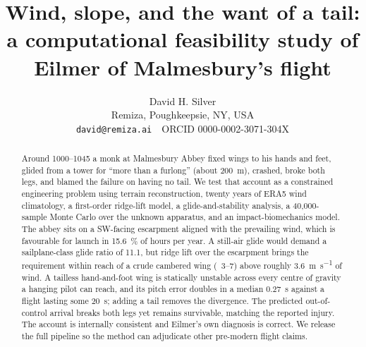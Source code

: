 \documentclass[11pt]{article}
\title{\bfseries Wind, slope, and the want of a tail:\\
a computational feasibility study of Eilmer of Malmesbury's flight}
\author{}
\author{David H. Silver \\[3pt]
    {\normalsize Remiza, Poughkeepsie, NY, USA} \\[1pt]
    {\small \texttt{david@remiza.ai} \,\textperiodcentered\, ORCID 0000-0002-3071-304X}}
\date{}
\begin{document}
\maketitle

\begin{abstract}
\noindent
Around 1000--1045 a monk at Malmesbury Abbey fixed wings to his hands and feet,
glided from a tower for ``more than a furlong'' (about \SI{200}{\meter}), crashed,
broke both legs, and blamed the failure on having no tail.
We test that account as a constrained engineering problem using terrain
reconstruction, twenty years of ERA5 wind climatology, a first-order ridge-lift
model, a glide-and-stability analysis, a 40,000-sample Monte Carlo over the unknown
apparatus, and an impact-biomechanics model.
The abbey sits on a SW-facing escarpment aligned with the prevailing wind, which is
favourable for launch in \SI{15.6}{\percent} of hours per year.
A still-air glide would demand a sailplane-class glide ratio of \num{11.1}, but
ridge lift over the escarpment brings the requirement within reach of a crude
cambered wing (\LD\ \numrange{3}{7}) above roughly \SI{3.6}{\meter\per\second} of
wind.
A tailless hand-and-foot wing is statically unstable across every centre of gravity
a hanging pilot can reach, and its pitch error doubles in a median \SI{0.27}{\second}
against a flight lasting some \SI{20}{\second}; adding a tail removes the divergence.
The predicted out-of-control arrival breaks both legs yet remains survivable,
matching the reported injury.
The account is internally consistent and Eilmer's own diagnosis is correct.
We release the full pipeline so the method can adjudicate other pre-modern flight
claims.
\end{abstract}








\printbibliography


\end{document}
